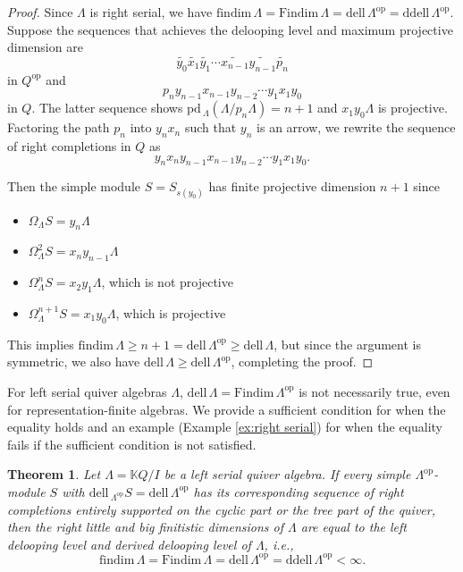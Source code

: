 \documentclass{conm-p-l}
\newcommand{\findim}{\mathrm{findim}\,}
\newcommand{\Findim}{\mathrm{Findim}\,}
\newcommand{\dell}{\mathrm{dell}\,}
\renewcommand{\dell}{\mathrm{dell}\,}
\newcommand{\pd}{\mathrm{pd}\,}
\newcommand{\op}{\mathrm{op}}
\renewcommand{\k}{\mathbb{K}}
\newcommand{\ddell}{\mathrm{ddell}\,}
\newtheorem{theorem}{Theorem}[section]
\theoremstyle{definition}
\theoremstyle{remark}
\numberwithin{equation}{section}
\begin{document}
\begin{proof}
Since $\Lambda$ is right serial, we have $\findim\Lambda = \Findim\Lambda = \dell\Lambda^{\op} = \ddell\Lambda^{\op}$. Suppose the sequences that achieves the delooping level and maximum projective dimension are 
\[
\widetilde{y_0}\widetilde{x_1}\widetilde{y_1}\cdots\widetilde{x_{n-1}}\widetilde{y_{n-1}}\widetilde{p_n}
\]
in $Q^{\op}$ and
\[p_ny_{n-1}x_{n-1}y_{n-2}\cdots y_1x_1y_0
\]
in $Q$. The latter sequence shows $\pd\!_{\Lambda} (\Lambda/p_n\Lambda) = n+1$ and $x_1y_0\Lambda$ is projective. Factoring the path $p_n$ into $y_nx_n$ such that $y_n$ is an arrow, we rewrite the sequence of right completions in $Q$ as
\begin{equation}
\label{eq:Nakayama}
y_nx_ny_{n-1}x_{n-1}y_{n-2}\cdots y_1x_1y_0.
\end{equation}

Then the simple module $S=S_{s(y_0)}$ has finite projective dimension $n+1$ since
\begin{itemize}
\item $\Omega_{\Lambda} S = y_n\Lambda$
\item $\Omega_{\Lambda}^2 S = x_ny_{n-1}\Lambda$
\item $\Omega_{\Lambda}^n S = x_2y_1\Lambda$, which is not projective
\item $\Omega_{\Lambda}^{n+1} S = x_1y_0\Lambda$, which is projective
\end{itemize}

This implies $\findim\Lambda\geq n+1=\dell\Lambda^{\op}\geq\dell\Lambda$, but since the argument is symmetric, we also have $\dell\Lambda\geq \dell\Lambda^{\op}$, completing the proof.
\end{proof}

For left serial quiver algebras $\Lambda$, $\dell\Lambda=\Findim\Lambda^{\op}$ is not necessarily true, even for representation-finite algebras. We provide a sufficient condition for when the equality holds and an example (Example \ref{ex:right serial}) for when the equality fails if the sufficient condition is not satisfied.

\begin{theorem}
\label{thm:left serial}
Let $\Lambda=\k Q/I$ be a left serial quiver algebra. If every simple $\Lambda^{\op}$-module $S$ with $\dell\!_{\Lambda^{\op}} S = \dell\Lambda^{\op}$ has its corresponding sequence of right completions entirely supported on the cyclic part or the tree part of the quiver, then the right little and big finitistic dimensions of $\Lambda$ are equal to the left delooping level and derived delooping level of $\Lambda$, \textit{i.e.},
\[
\findim\Lambda = \Findim\Lambda = \dell\Lambda^{\op} = \ddell\Lambda^{\op} < \infty.
\]
\end{theorem}
\end{document}
